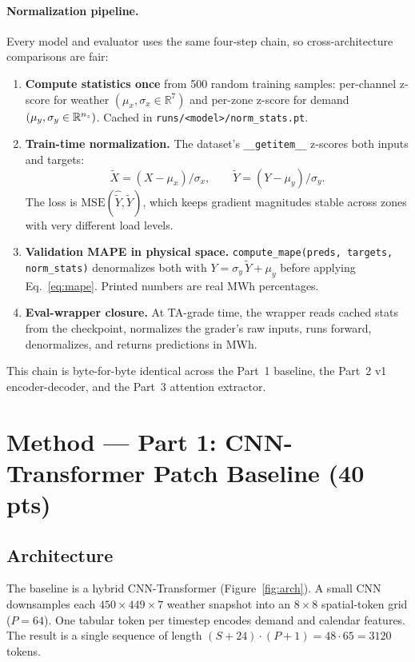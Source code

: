 \documentclass[11pt,letterpaper]{article}
\begin{document}
\paragraph{Normalization pipeline.} Every model and evaluator uses the same four-step chain, so cross-architecture comparisons are fair:
\begin{enumerate}
  \item \textbf{Compute statistics once} from 500 random training samples: per-channel z-score for weather $(\mu_x, \sigma_x \in \mathbb{R}^{7})$ and per-zone z-score for demand $(\mu_y, \sigma_y \in \mathbb{R}^{n_{z}})$. Cached in \texttt{runs/<model>/norm\_stats.pt}.
  \item \textbf{Train-time normalization.} The dataset's \texttt{\_\_getitem\_\_} z-scores both inputs and targets:
    \begin{equation}
        \tilde X = (X-\mu_x)/\sigma_x,\qquad \tilde Y = (Y-\mu_y)/\sigma_y.
        \label{eq:zscore}
    \end{equation}
    The loss is $\mathrm{MSE}(\hat{\tilde Y},\tilde Y)$, which keeps gradient magnitudes stable across zones with very different load levels.
  \item \textbf{Validation MAPE in physical space.} \texttt{compute\_mape(preds, targets, norm\_stats)} denormalizes both with $Y = \sigma_y\,\tilde Y + \mu_y$ before applying Eq.~\eqref{eq:mape}. Printed numbers are real MWh percentages.
  \item \textbf{Eval-wrapper closure.} At TA-grade time, the wrapper reads cached stats from the checkpoint, normalizes the grader's raw inputs, runs forward, denormalizes, and returns predictions in MWh.
\end{enumerate}
This chain is byte-for-byte identical across the Part~1 baseline, the Part~2 v1 encoder-decoder, and the Part~3 attention extractor.

\section{Method --- Part 1: CNN-Transformer Patch Baseline (40\,pts)}
\label{sec:method}

\subsection{Architecture}

The baseline is a hybrid CNN-Transformer (Figure~\ref{fig:arch}). A small CNN downsamples each $450{\times}449{\times}7$ weather snapshot into an $8{\times}8$ spatial-token grid ($P=64$). One tabular token per timestep encodes demand and calendar features. The result is a single sequence of length $(S+24)\cdot(P+1) = 48 \cdot 65 = 3120$ tokens.
\end{document}
